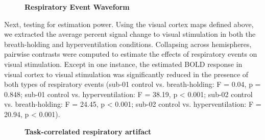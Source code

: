 \documentclass[9pt]{NEU502b-fmri}
\begin{document}
\begin{figure}
\centerline{%
%
}
\caption{\textbf{Respiratory Event Waveform}}

\end{figure}

Next, testing for estimation power. Using the visual cortex maps defined above, we extracted the average percent signal change to visual stimulation in both the breath-holding and hyperventilation conditions. Collapsing across hemispheres, pairwise contrasts were computed to estimate the effects of respiratory events on visual stimulation. Except in one instance, the estimated BOLD response in visual cortex to visual stimulation was significantly reduced in the presence of both types of respiratory events (sub-01 control vs. breath-holding: F = 0.04, p = 0.848; sub-01 control vs. hyperventilation: F = 38.19, p < 0.001; sub-02 control vs. breath-holding: F = 24.45, p < 0.001; sub-02 control vs. hyperventilation: F = 20.94, p < 0.001). 

\begin{figure}
\centerline{%
%
}
\caption{\textbf{Task-correlated respiratory artifact}}

\end{figure}
\end{document}
